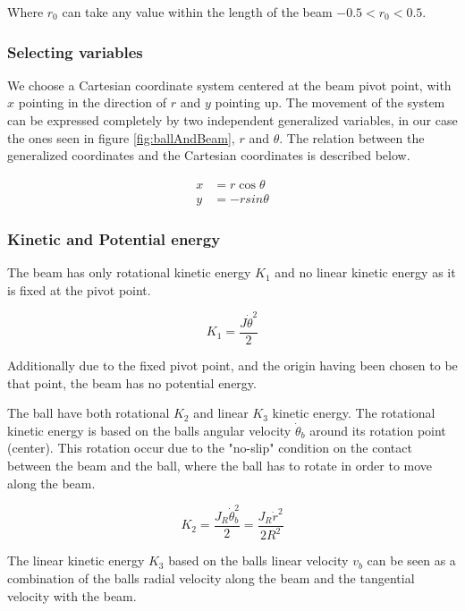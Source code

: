 \documentclass[a4paper, titlepage]{article}
\begin{document}
Where $r_0$ can take any value within the length of the beam $-0.5 < r_0 < 0.5$.

\subsubsection{Selecting variables}
We choose a Cartesian coordinate system centered at the beam pivot point, with $x$ pointing in the direction of $r$ and $y$ pointing up.
The movement of the system can be expressed completely by two independent generalized variables, in our case the ones seen in figure \ref{fig:ballAndBeam}, $r$ and $\theta$.
The relation between the generalized coordinates and the Cartesian coordinates is described below.

\begin{equation}
\begin{split}
x &= r\cos{\theta} \\
y &= -rsin{\theta}
\end{split}
\end{equation}

\subsubsection{Kinetic and Potential energy}
The beam has only rotational kinetic energy $K_1$ and no linear kinetic energy as it is fixed at the pivot point.

\begin{equation}
K_1 = \frac{J\dot{\theta}^2}{2}
\end{equation}

Additionally due to the fixed pivot point, and the origin having been chosen to be that point, the beam has no potential energy.

The ball have both rotational $K_2$ and linear $K_3$ kinetic energy.
The rotational kinetic energy is based on the balls angular velocity $\dot{\theta}_b$ around its rotation point (center).
This rotation occur due to the "no-slip" condition on the contact between the beam and the ball, where the ball has to rotate in order to  move along the beam.

\begin{equation}
K_2 = \frac{J_R\dot{\theta}_b^2}{2} = \frac{J_R\dot{r}^2}{2R^2}
\end{equation}

The linear kinetic energy $K_3$ based on the balls linear velocity $v_b$ can be seen as a combination of the balls radial velocity along the beam and the tangential velocity with the beam.
\end{document}
